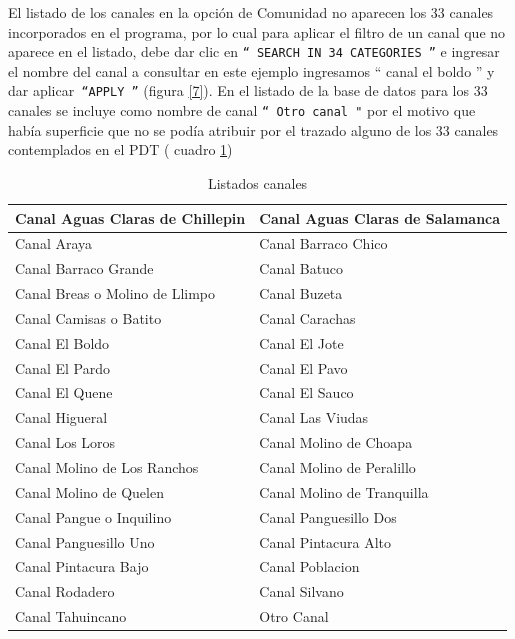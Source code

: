 \documentclass[10pt]{article}
\begin{document}
El listado de los canales en la opción de Comunidad no aparecen los 33 canales incorporados en el programa, por lo cual para aplicar el filtro de un canal que no aparece en el listado, debe dar clic en \texttt{“ SEARCH IN 34 CATEGORIES ”} e ingresar el nombre del canal a consultar en este ejemplo ingresamos “ canal el boldo ” y dar aplicar\texttt{ “APPLY  ”} (figura \ref{7}). En el listado de la base de datos para los 33 canales se incluye como nombre de canal \texttt{“ Otro canal "} por el motivo que había superficie que no se podía atribuir por el trazado alguno de los 33 canales contemplados en el PDT ( cuadro \ref{cuadro canales})\bigskip\setlength{\parindent}{0pt}

\begin{table}[H]
\centering
\caption{Listados canales}
\label{cuadro canales}
\begin{tabular}{|l|l|}
\hline
Canal Aguas Claras de Chillepin & Canal Aguas Claras de Salamanca \\ \hline
Canal Araya                     & Canal Barraco Chico             \\ \hline
Canal Barraco Grande            & Canal Batuco                    \\ \hline
Canal Breas o Molino de Llimpo  & Canal Buzeta                    \\ \hline
Canal Camisas o Batito          & Canal Carachas                  \\ \hline
Canal El Boldo                  & Canal El Jote                   \\ \hline
Canal El Pardo                  & Canal El Pavo                   \\ \hline
Canal El Quene                  & Canal El Sauco                  \\ \hline
Canal Higueral                  & Canal Las Viudas                \\ \hline
Canal Los Loros                 & Canal Molino de Choapa          \\ \hline
Canal Molino de Los Ranchos     & Canal Molino de Peralillo       \\ \hline
Canal Molino de Quelen          & Canal Molino de Tranquilla      \\ \hline
Canal Pangue o Inquilino        & Canal Panguesillo Dos           \\ \hline
Canal Panguesillo Uno           & Canal Pintacura Alto            \\ \hline
Canal Pintacura Bajo            & Canal Poblacion                 \\ \hline
Canal Rodadero                  & Canal Silvano                   \\ \hline
Canal Tahuincano                & Otro Canal                      \\ \hline
\end{tabular}
\end{table}
\end{document}
